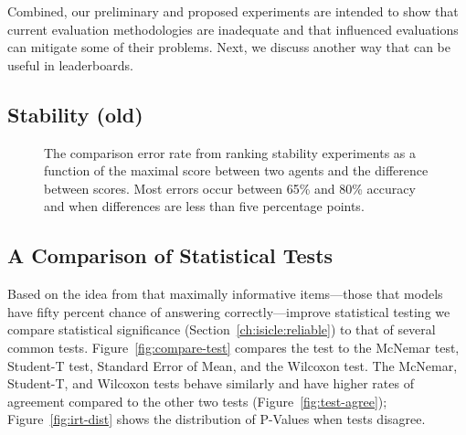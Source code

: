 Combined, our preliminary and proposed experiments are intended to show that current evaluation methodologies are inadequate and that \irt{} influenced evaluations can mitigate some of their problems.
Next, we discuss another way that \irt{} can be useful in leaderboards.



\subsection{Stability (old)}
\begin{figure}[t]
    \centering
    \hspace{.01\textwidth}
    \caption{
        The comparison error rate from ranking stability experiments as a function of the maximal score between two agents and the difference between scores.
        Most errors occur between 65\% and 80\% accuracy and when differences are less than five percentage points.
    }
    \label{fig:stability-old}
\end{figure}

\subsection{A Comparison of Statistical Tests}

Based on the idea from \irt{} that maximally informative items---those that models have fifty percent chance of answering correctly---improve statistical testing we compare \irt{} statistical significance (Section~\ref{ch:isicle:reliable}) to that of several common tests.
Figure~\ref{fig:compare-test} compares the \irt{} test to the McNemar test, Student-T test, Standard Error of Mean, and the Wilcoxon test.
The McNemar, Student-T, and Wilcoxon tests behave similarly and have higher rates of agreement compared to the other two tests (Figure~\ref{fig:test-agree}); Figure~\ref{fig:irt-dist} shows the distribution of P-Values when tests disagree.

